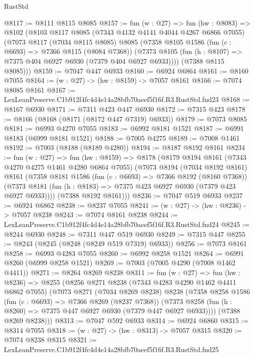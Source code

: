 \begin{lexlean}{RustStd}
\begin{coremodule}
@8117 := @8111 @8115 @8085
@8157 := fun (w : @27) =>
  fun (hw : @8083) =>
  @8102
    (@8103
      @8117
      @8085
      (@7343 @4132 @4141 @4044 @4267 @6866 @7055)
      (@7073
        @8117
        (@7034 @8115 @8085)
        @8085
        (@7358
          @8105
          @1586
          (fun (c : @6693) => @7366 @8115 (@8084 @7368))
          (@7373 @8105 (fun (h : @8107) => @7375 @404 @6927 @6930 (@7379 @404 @6927 @6933))))
        (@7388 @8115 @8085)))
@8159 := @7047 @447 @6933
@8160 := @6924 @6864
@8161 := @8160 @7055
@8164 := (w : @27) -> (hw : @8159) -> @7057 @8161
@8166 := @7074 @8085 @8161
@8167 := LexLeanPreserve.C1b912f4fc4d4e14a28bfb70aeef5f16f.R3.RustStd.fnd23
@8168 := @8167 @6930
@8171 := @7311 @423 @447 @6930
@8172 := @7315 @423
@8178 := @8166 (@8168 (@8171 (@8172 @447 @7319) @6933))
@8179 := @7073 @8085
@8181 := @6993 @4270 @7055
@8183 := @6992 @8181 @1521
@8187 := @6991 @8183 (@6999 @8181 @1521)
@8188 := @7005 @4275
@8189 := @7008 @1461
@8192 := @7003 (@8188 (@8189 @4280))
@8194 := @8187 @8192 @8161
@8234 := fun (w : @27) =>
  fun (hw : @8159) =>
  @8178
    (@8179
      @8194
      @8161
      (@7343 @4270 @4275 @1461 @4280 @6864 @7055)
      (@7073
        @8194
        (@7034 @8192 @8161)
        @8161
        (@7358
          @8181
          @1586
          (fun (c : @6693) => @7366 @8192 (@8160 @7368))
          (@7373 @8181 (fun (h : @8183) => @7375 @423 @6927 @6930 (@7379 @423 @6927 @6933))))
        (@7388 @8192 @8161)))
@8236 := @7047 @519 @6933
@8237 := @6924 @6862
@8238 := @8237 @7055
@8241 := (w : @27) -> (hw : @8236) -> @7057 @8238
@8243 := @7074 @8161 @8238
@8244 := LexLeanPreserve.C1b912f4fc4d4e14a28bfb70aeef5f16f.R3.RustStd.fnd24
@8245 := @8244 @6930
@8248 := @7311 @447 @519 @6930
@8249 := @7315 @447
@8255 := @8243 (@8245 (@8248 (@8249 @519 @7319) @6933))
@8256 := @7073 @8161
@8258 := @6993 @4283 @7055
@8260 := @6992 @8258 @1521
@8264 := @6991 @8260 (@6999 @8258 @1521)
@8269 := @7003 (@7005 @4290 (@7008 @1462 @4411))
@8271 := @8264 @8269 @8238
@8311 := fun (w : @27) =>
  fun (hw : @8236) =>
  @8255
    (@8256
      @8271
      @8238
      (@7343 @4283 @4290 @1462 @4411 @6862 @7055)
      (@7073
        @8271
        (@7034 @8269 @8238)
        @8238
        (@7358
          @8258
          @1586
          (fun (c : @6693) => @7366 @8269 (@8237 @7368))
          (@7373 @8258 (fun (h : @8260) => @7375 @447 @6927 @6930 (@7379 @447 @6927 @6933))))
        (@7388 @8269 @8238)))
@8313 := @7047 @592 @6933
@8314 := @6924 @6860
@8315 := @8314 @7055
@8318 := (w : @27) -> (hw : @8313) -> @7057 @8315
@8320 := @7074 @8238 @8315
@8321 := LexLeanPreserve.C1b912f4fc4d4e14a28bfb70aeef5f16f.R3.RustStd.fnd25

\end{coremodule}
\end{lexlean}
